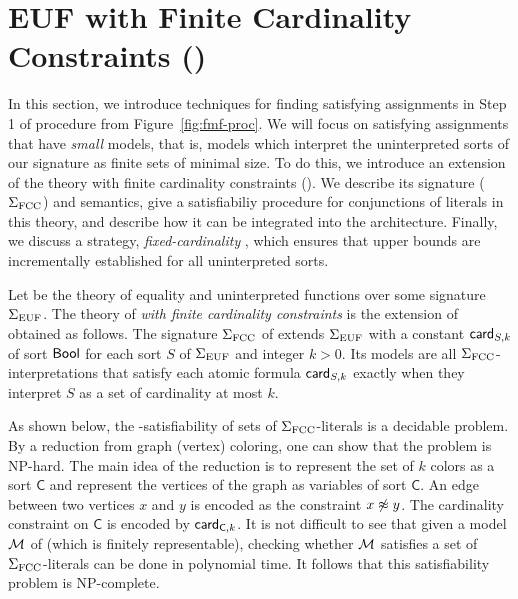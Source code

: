 \documentclass{svjour3}                     %
\begin{document}
\section{EUF with Finite Cardinality Constraints (\fcc)} \label{sec:t-fcc}

In this section, we introduce techniques for finding
satisfying assignments in Step 1 of procedure \fmsolve
from Figure~\ref{fig:fmf-proc}.
We will focus on satisfying assignments that have \emph{small} models, that is,
models which interpret the uninterpreted sorts of our signature as finite sets of minimal size.
To do this, we introduce an extension of the theory \euf with finite cardinality constraints (\fcc).
We describe its signature ($\Sigma_\fcc$) and semantics,
give a satisfiabiliy procedure for conjunctions of literals in this theory, 
and describe how it can be integrated into the \dpllts architecture.
Finally, we discuss a strategy, \emph{fixed-cardinality \checkfcc},
which ensures that upper bounds are incrementally established for all uninterpreted sorts.

\begin{definition}[\fcc]
Let \euf be the theory of equality and uninterpreted functions over some signature $\Sigma_\euf$.
The theory \fcc of \emph{\euf with finite cardinality constraints} is the extension of \euf
obtained as follows.
The signature $\Sigma_\fcc$ of \fcc extends $\Sigma_\euf$ with
a constant $\card[S,k]$ of sort $\bool$
for each sort $S$ of $\Sigma_\euf$ and integer $k > 0$.
Its models are all $\Sigma_\fcc$-interpretations 
that satisfy each atomic formula $\card[S,k]$ exactly when they interpret $S$
as a set of cardinality at most $k$.
\end{definition}

As shown below, the \fcc-satisfiability of sets of $\Sigma_\fcc$-literals
is a decidable problem.
By a reduction from graph (vertex) coloring, one can show that the problem is NP-hard.
The main idea of the reduction is to represent the set of $k$ colors as a sort $\mathsf{C}$
and represent the vertices of the graph as variables of sort $\mathsf{C}$.
An edge between two vertices $x$ and $y$ is encoded as the constraint $x \tneq y$.
The cardinality constraint on $\mathsf{C}$ is encoded by $\card[\mathsf{C},k]$.
It is not difficult to see that given a model $\M$ of \fcc
(which is finitely representable), checking whether $\M$ satisfies a set of 
$\Sigma_\fcc$-literals can be done in polynomial time.
It follows that this satisfiability problem is NP-complete.
\end{document}
